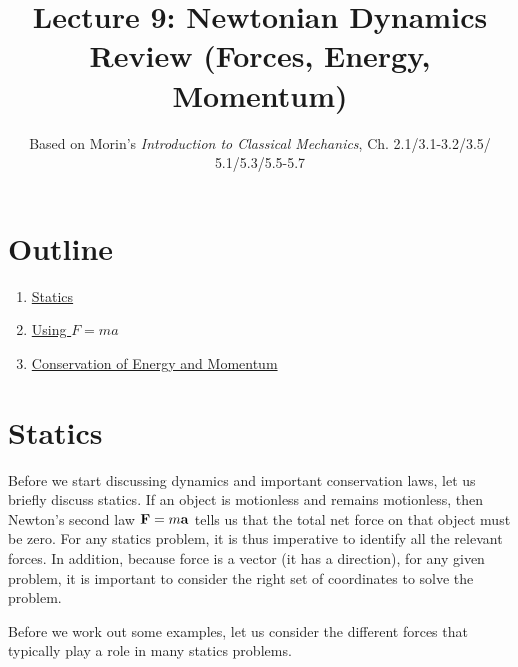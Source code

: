 \documentclass[12pt]{article}
\title{\textbf{Lecture 9: Newtonian Dynamics Review (Forces, Energy, Momentum)}}
\author{Based on Morin's \textit{Introduction to Classical Mechanics}, Ch. 2.1/3.1-3.2/3.5/\\5.1/5.3/5.5-5.7}
\date{}
\begin{document}
\maketitle

\section*{Outline}
\begin{enumerate}
    \item \href{sec:statics}{Statics}
    \item \href{sec:Newton}{Using $F = ma$}
    \item \href{sec:Conservation}{Conservation of Energy and Momentum}
\end{enumerate}

\section{Statics}\label{sec:statics}
Before we start discussing dynamics and important conservation laws, let us briefly discuss statics. If an object is motionless and remains motionless, then Newton's second law ${\bf F} = m {\bf a}$ tells us that the total net force on that object must be zero. For any statics problem, it is thus imperative to identify all the relevant forces. In addition, because force is a vector (it has a direction), for any given problem, it is important to consider the right set of coordinates to solve the problem.

Before we work out some examples, let us consider the different forces that typically play a role in many statics problems. 
\end{document}
